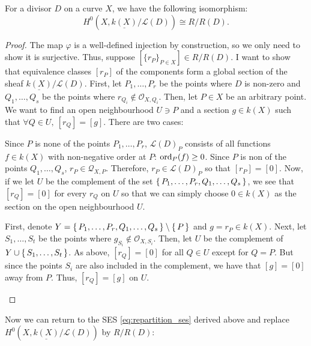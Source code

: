\begin{lemm}
  For a divisor $D$ on a curve $X$, we have the following isomorphism:
  \[
    H^{0}(X,\underline{k(X)}/\mathcal{L}(D))\cong R/R(D).
  \]
\end{lemm}
\begin{proof}
  The map $\varphi$ is a well-defined injection by construction,
  so we only need to show it is surjective. Thus,
  suppose $[\{r_{P}\}_{P\in X}]\in R/R(D)$. I want to show that equivalence
  classes $[r_{P}]$ of the components form a global section of the sheaf
  $\underline{k(X)}/\mathcal{L}(D)$. First, let $P_{1},\ldots,P_{r}$
  be the points where $D$ is non-zero and $Q_{1},\ldots,Q_{s}$ be the
  points where $r_{Q_{i}}\not\in \mathscr{O}_{X,Q_{i}}$. Then, let $P\in X$
  be an arbitrary point. We want to find an open neighbourhood $U\ni P$
  and a section $g\in k(X)$ such that $\forall Q\in U,\ [r_{Q}]=[g]$.
  There are two cases:
  \begin{description}[style=nextline]
    \item[$P\not\in\set{P_{1},\ldots,P_{r},Q_{1},\ldots,Q_{s}}\big)$]
          Since $P$ is none of the points $P_{1},\ldots,P_{r}$,
          $\mathcal{L}(D)_{P}$ consists of all functions $f\in k(X)$
          with non-negative order at $P$: $\operatorname{ord}_{P}(f)\geq 0$.
          Since $P$ is non of the points $Q_{1},\ldots,Q_{s}$,
          $r_{P}\in\mathscr{Q}_{X,P}$. Therefore, $r_{P}\in\mathcal{L}(D)_{P}$
          so that $[r_{P}]=[0]$. Now, if we let $U$ be the complement of
          the set $\set{P_{1},\ldots,P_{r},Q_{1},\ldots,Q_{s}}$, we see
          that $[r_{Q}]=[0]$ for every $r_{Q}$ on $U$ so that we can simply
          choose $0\in k(X)$ as the section on the open neighbourhood $U$.
    \item[$P\in\set{P_{1},\ldots,P_{r},Q_{1},\ldots,Q_{s}}\big)$]
          First, denote $Y=\set{P_{1},\ldots,P_{r},Q_{1},\ldots,Q_{s}}
          \setminus \set{P}$ and $g=r_{P}\in k(X)$. Next, let
          $S_{1},\ldots,S_{t}$ be the points where
          $g_{S_{i}}\not\in\mathscr{O}_{X,S_{i}}$. Then, let $U$ be
          the complement of $Y\cup \set{S_{1},\ldots,S_{t}}$. As above,
          $[r_{Q}]=[0]$ for all $Q\in U$ except for $Q=P$. But since
          the points $S_{i}$ are also included in the complement, we have
          that $[g]=[0]$ away from $P$. Thus, $[r_{Q}]=[g]$ on $U$.
  \end{description}
\end{proof}
Now we can return to the SES \eqref{eq:repartition_ses} derived above and
replace $H^{0}(X,\underline{k(X)}/\mathcal{L}(D))$ by $R/R(D)$:
